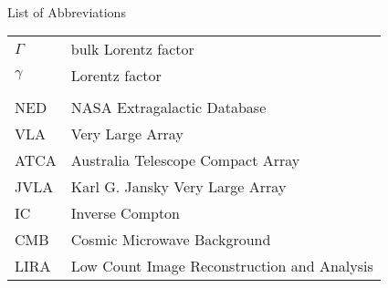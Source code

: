 
\renewcommand{\baselinestretch}{1}
\small\normalsize
\hbox{\ }

\vspace{-3em}


\begin{center}
\large{List of Abbreviations}
\end{center} 

\vspace{3pt}

\begin{tabular}{ll}
$\Gamma$ & bulk Lorentz factor \\
$\gamma$  & Lorentz factor \\
&  \\ 
NED & NASA Extragalactic Database \\
VLA & Very Large Array \\
ATCA & Australia Telescope Compact Array\\
JVLA & Karl G. Jansky Very Large Array\\
IC & Inverse Compton\\
CMB & Cosmic Microwave Background \\
LIRA & Low Count Image Reconstruction and Analysis\\
\end{tabular}
